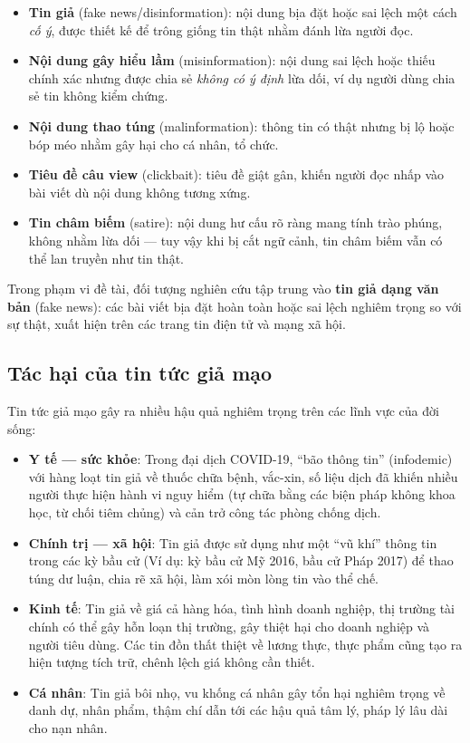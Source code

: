 \begin{itemize}
    \item \textbf{Tin giả} (fake news/disinformation): nội dung bịa đặt hoặc sai lệch một cách \textit{cố ý}, được thiết kế để trông giống tin thật nhằm đánh lừa người đọc.
    \item \textbf{Nội dung gây hiểu lầm} (misinformation): nội dung sai lệch hoặc thiếu chính xác nhưng được chia sẻ \textit{không có ý định} lừa dối, ví dụ người dùng chia sẻ tin không kiểm chứng.
    \item \textbf{Nội dung thao túng} (malinformation): thông tin có thật nhưng bị lộ hoặc bóp méo nhằm gây hại cho cá nhân, tổ chức.
    \item \textbf{Tiêu đề câu view} (clickbait): tiêu đề giật gân, khiến người đọc nhấp vào bài viết dù nội dung không tương xứng.
    \item \textbf{Tin châm biếm} (satire): nội dung hư cấu rõ ràng mang tính trào phúng, không nhằm lừa dối --- tuy vậy khi bị cắt ngữ cảnh, tin châm biếm vẫn có thể lan truyền như tin thật.
\end{itemize}

Trong phạm vi đề tài, đối tượng nghiên cứu tập trung vào \textbf{tin giả dạng văn bản} (fake news): các bài viết bịa đặt hoàn toàn hoặc sai lệch nghiêm trọng so với sự thật, xuất hiện trên các trang tin điện tử và mạng xã hội.

\subsection{Tác hại của tin tức giả mạo}

Tin tức giả mạo gây ra nhiều hậu quả nghiêm trọng trên các lĩnh vực của đời sống:

\begin{itemize}
    \item \textbf{Y tế --- sức khỏe}: Trong đại dịch COVID-19, ``bão thông tin'' (infodemic) với hàng loạt tin giả về thuốc chữa bệnh, vắc-xin, số liệu dịch đã khiến nhiều người thực hiện hành vi nguy hiểm (tự chữa bằng các biện pháp không khoa học, từ chối tiêm chủng) và cản trở công tác phòng chống dịch.
    \item \textbf{Chính trị --- xã hội}: Tin giả được sử dụng như một ``vũ khí'' thông tin trong các kỳ bầu cử (Ví dụ: kỳ bầu cử Mỹ 2016, bầu cử Pháp 2017) để thao túng dư luận, chia rẽ xã hội, làm xói mòn lòng tin vào thể chế.
    \item \textbf{Kinh tế}: Tin giả về giá cả hàng hóa, tình hình doanh nghiệp, thị trường tài chính có thể gây hỗn loạn thị trường, gây thiệt hại cho doanh nghiệp và người tiêu dùng. Các tin đồn thất thiệt về lương thực, thực phẩm cũng tạo ra hiện tượng tích trữ, chênh lệch giá không cần thiết.
    \item \textbf{Cá nhân}: Tin giả bôi nhọ, vu khống cá nhân gây tổn hại nghiêm trọng về danh dự, nhân phẩm, thậm chí dẫn tới các hậu quả tâm lý, pháp lý lâu dài cho nạn nhân.
\end{itemize}

